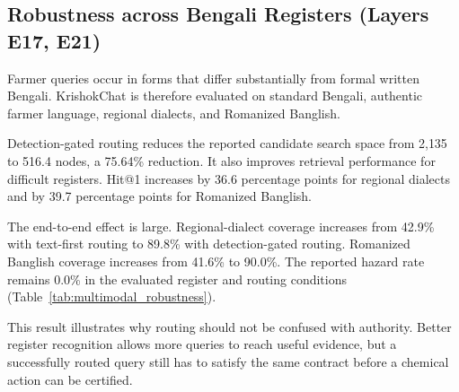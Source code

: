\documentclass[a4paper,fleqn]{cas-dc}
\begin{document}
\subsection{Robustness across Bengali Registers (Layers E17, E21)}

Farmer queries occur in forms that differ substantially from formal written Bengali. KrishokChat is therefore evaluated on standard Bengali, authentic farmer language, regional dialects, and Romanized Banglish.

Detection-gated routing reduces the reported candidate search space from 2{,}135 to 516.4 nodes, a 75.64\% reduction. It also improves retrieval performance for difficult registers. Hit@1 increases by 36.6 percentage points for regional dialects and by 39.7 percentage points for Romanized Banglish.

The end-to-end effect is large. Regional-dialect coverage increases from 42.9\% with text-first routing to 89.8\% with detection-gated routing. Romanized Banglish coverage increases from 41.6\% to 90.0\%. The reported hazard rate remains 0.0\% in the evaluated register and routing conditions (Table~\ref{tab:multimodal_robustness}).

This result illustrates why routing should not be confused with authority. Better register recognition allows more queries to reach useful evidence, but a successfully routed query still has to satisfy the same contract before a chemical action can be certified.
\end{document}
